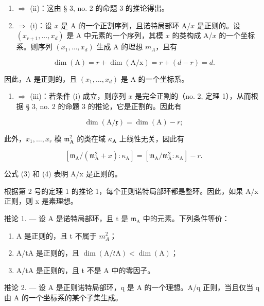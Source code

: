 \begin{enumerate}
\def\labelenumi{(\roman{enumi})}
\setcounter{enumi}{2}
\item
  \(\Rightarrow\) (ii)：这由 § 3, no. 2 的命题 3 的推论得出。
\item
  \(\Rightarrow\) (i)：设 \(x\) 是 A 的一个正割序列，且诺特局部环 A/\(x\) 是正则的。设 \((x_{r+1}, ..., x_d)\) 是 A 中元素的一个序列，其模 \(x\) 的类构成 A/\(x\) 的一个坐标系。则序列 \((x_1, ..., x_d)\) 生成 A 的理想 \(m_A\)，且有
\end{enumerate}

\[
\dim (\mathrm{A}) = r + \dim (\mathrm{A} / \mathrm{x}) = r + (d - r) = d.
\]

因此，A 是正则的，且 \((x_{1},\ldots,x_{d})\) 是 A 的一个坐标系。

\begin{enumerate}
\def\labelenumi{(\roman{enumi})}
\tightlist
\item
  \(\Rightarrow\) (iii)：若条件 (i) 成立，则序列 \(x\) 是完全正割的（no. 2, 定理 1），从而根据 § 3, no. 2 的命题 3 的推论，它是正割的。因此有
\end{enumerate}

\[
\dim (\mathrm{A} / \mathfrak {x}) = \dim (\mathrm{A}) - r;\tag{3}
\]

此外，\(x_{1},\ldots,x_{r}\) 模 \(\mathfrak{m}_{\mathbf{A}}^{2}\) 的类在域 \(\kappa_{\mathbf{A}}\) 上线性无关，因此有

\[
\left[ \mathfrak {m} _ {\mathrm{A}} / (\mathfrak {m} _ {\mathrm{A}} ^ {2} + x): \kappa_ {\mathrm{A}} \right] = \left[ \mathfrak {m} _ {\mathrm{A}} / \mathfrak {m} _ {\mathrm{A}} ^ {2}: \kappa_ {\mathrm{A}} \right] - r.\tag{4}
\]

公式 (3) 和 (4) 表明 A/x 是正则的。

根据第 2 号的定理 1 的推论 1，每个正则诺特局部环都是整环。因此，如果 A/x 正则，则 x 是素理想。

推论 1. --- 设 A 是诺特局部环，且 t 是 \(\mathfrak{m}_{\mathrm{A}}\) 中的元素。下列条件等价：

\begin{enumerate}
\def\labelenumi{(\roman{enumi})}
\item
  A 是正则的，且 t 不属于 \(m_{A}^{2}\)；
\item
  A/tA 是正则的，且 \(\dim(\mathrm{A}/t\mathrm{A}) < \dim(\mathrm{A})\)；
\item
  A/tA 是正则的，且 t 不是 A 中的零因子。
\end{enumerate}

推论 2. --- 设 A 是正则诺特局部环，q 是 A 的一个理想。A/q 正则，当且仅当 q 由 A 的一个坐标系的某个子集生成。

